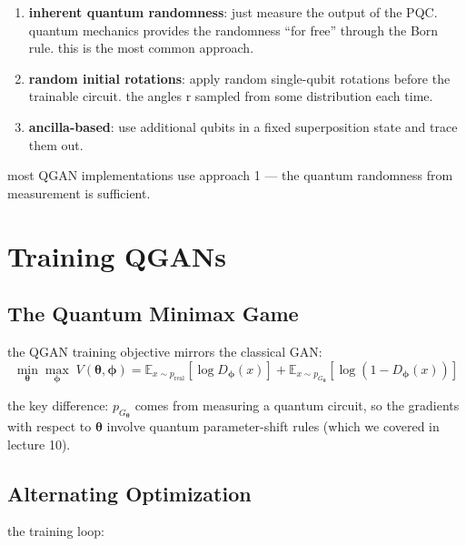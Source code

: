 \documentclass[11pt,a4paper]{article}
\theoremstyle{definition}
\theoremstyle{remark}
\begin{document}
\begin{enumerate}[label=\arabic*.]
    \item \textbf{inherent quantum randomness}: just measure the output of the PQC. quantum mechanics provides the randomness ``for free'' through the Born rule. this is the most common approach.

    \item \textbf{random initial rotations}: apply random single-qubit rotations before the trainable circuit. the angles r sampled from some distribution each time.

    \item \textbf{ancilla-based}: use additional qubits in a fixed superposition state and trace them out.
\end{enumerate}

most QGAN implementations use approach 1 --- the quantum randomness from measurement is sufficient.

\section{Training QGANs}

\subsection{The Quantum Minimax Game}

the QGAN training objective mirrors the classical GAN:
\[
\min_{\boldsymbol{\theta}} \max_{\boldsymbol{\phi}} \; V(\boldsymbol{\theta}, \boldsymbol{\phi}) = \mathbb{E}_{x \sim p_{\text{real}}}[\log D_{\boldsymbol{\phi}}(x)] + \mathbb{E}_{x \sim p_{G_{\boldsymbol{\theta}}}}[\log(1 - D_{\boldsymbol{\phi}}(x))]
\]

the key difference: $p_{G_{\boldsymbol{\theta}}}$ comes from measuring a quantum circuit, so the gradients with respect to $\boldsymbol{\theta}$ involve quantum parameter-shift rules (which we covered in lecture 10).

\subsection{Alternating Optimization}

the training loop:
\end{document}
